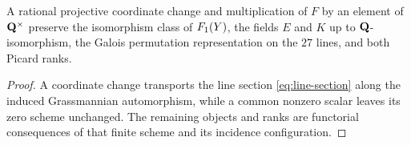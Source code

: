 \begin{corollary}
\label{cor:projective-invariance}
A rational projective coordinate change and multiplication of \(F\) by an
element of \(\mathbf Q^\times\) preserve the isomorphism class of \(F_1(Y)\), the
fields \(E\) and \(K\) up to \(\mathbf Q\)-isomorphism, the Galois permutation
representation on the \(27\) lines, and both Picard ranks.
\end{corollary}

\begin{proof}
A coordinate change transports the line section
\cref{eq:line-section} along the induced Grassmannian automorphism, while a
common nonzero scalar leaves its zero scheme unchanged.  The remaining
objects and ranks are functorial consequences of that finite scheme and its
incidence configuration.
\end{proof}
